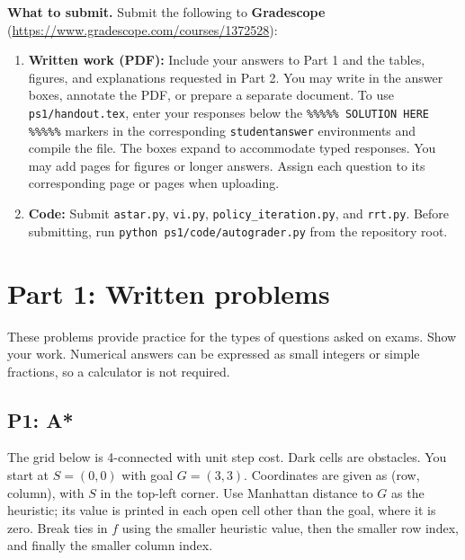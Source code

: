 \documentclass[11pt]{article}
\newcommand{\gradescopelink}{\textbf{Gradescope} (\url{https://www.gradescope.com/courses/1372528})}
\begin{document}
\textbf{What to submit.} Submit the following to \gradescopelink:
\begin{enumerate}
\item \textbf{Written work (PDF):} Include your answers to Part 1 and the
      tables, figures, and explanations requested in Part 2. You may
      write in the answer boxes, annotate the PDF, or prepare a separate
      document. To use \texttt{ps1/handout.tex}, enter your responses below
      the \texttt{\%\%\%\%\% SOLUTION HERE \%\%\%\%\%} markers in the
      corresponding \texttt{studentanswer} environments and compile the
      file. The boxes expand to accommodate typed responses. You may add
      pages for figures or longer answers. Assign each question to its
      corresponding page or pages when uploading.
\item \textbf{Code:} Submit \texttt{astar.py}, \texttt{vi.py},
      \texttt{policy\_iteration.py}, and \texttt{rrt.py}. Before submitting,
      run \texttt{python ps1/code/autograder.py} from the repository root.
\end{enumerate}

\clearpage
\section{Part 1: Written problems}

These problems provide practice for the types of questions asked on
exams. Show your work. Numerical answers can be expressed as small
integers or simple fractions, so a calculator is not required.

\subsection*{P1: A*}

The grid below is 4-connected with unit step cost. Dark cells are obstacles.
You start at $S = (0,0)$ with goal $G = (3,3)$. Coordinates are given as
(row, column), with $S$ in the top-left corner. Use Manhattan distance to
$G$ as the heuristic; its value is printed in each open cell other than
the goal, where it is zero. Break ties in $f$ using the smaller heuristic
value, then the smaller row index, and finally the smaller column index.
\begin{center}
\end{center}
\end{document}
